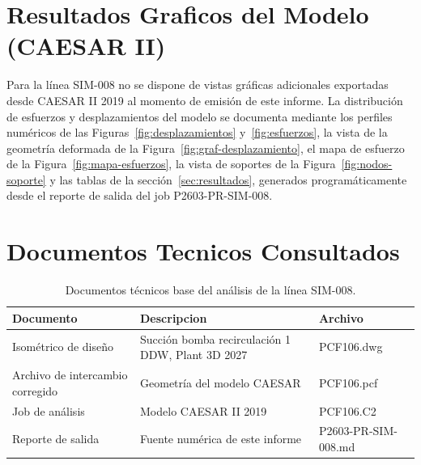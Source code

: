 \appendix
\section{Resultados Graficos del Modelo (CAESAR II)}
\label{appendix:graficos}

Para la l\'{i}nea SIM-008 no se dispone de vistas gr\'{a}ficas adicionales
exportadas desde CAESAR II 2019 al momento de emisi\'{o}n de este informe. La
distribuci\'{o}n de esfuerzos y desplazamientos del modelo se documenta
mediante los perfiles num\'{e}ricos de las Figuras~\ref{fig:desplazamientos}
y~\ref{fig:esfuerzos}, la vista de la geometr\'{i}a deformada de la
Figura~\ref{fig:graf-desplazamiento}, el mapa de esfuerzo de la
Figura~\ref{fig:mapa-esfuerzos}, la vista de soportes de la
Figura~\ref{fig:nodos-soporte} y las tablas de la
secci\'{o}n~\ref{sec:resultados}, generados program\'{a}ticamente desde el
reporte de salida del job P2603-PR-SIM-008.

\section{Documentos Tecnicos Consultados}
\label{appendix:documentos}

\begin{table}[htbp]
    \centering
    \small
    \caption{Documentos t\'{e}cnicos base del an\'{a}lisis de la l\'{i}nea SIM-008.}
    \label{tab:planos}
    \begin{tabular}{@{}lll@{}}
        \toprule
        \textbf{Documento} & \textbf{Descripcion} & \textbf{Archivo} \\
        \midrule
        Isom\'{e}trico de dise\~{n}o & Succión bomba recirculaci\'{o}n 1 DDW, Plant 3D 2027 & PCF106.dwg \\
        Archivo de intercambio corregido & Geometr\'{i}a del modelo CAESAR & PCF106.pcf \\
        Job de an\'{a}lisis & Modelo CAESAR II 2019 & PCF106.C2 \\
        Reporte de salida & Fuente num\'{e}rica de este informe & P2603-PR-SIM-008.md \\
        \bottomrule
    \end{tabular}
\end{table}
